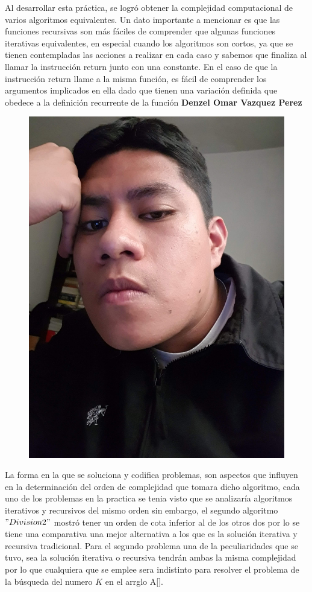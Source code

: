\documentclass[12pt,twoside]{article}
\begin{document}
    Al desarrollar esta práctica, se logró obtener la complejidad computacional de varios algoritmos equivalentes. Un dato importante a mencionar es que las funciones recursivas son más fáciles de comprender que algunas funciones iterativas equivalentes, en especial cuando los algoritmos son cortos, ya que se tienen contempladas las acciones a realizar en cada caso y sabemos que finaliza al llamar la instrucción return junto con una constante. En el caso de que la instrucción return llame a la misma función, es fácil de comprender los argumentos implicados en ella dado que tienen una variación definida que obedece a la definición recurrente de la función
    \newpage
    \textbf{\large Denzel Omar Vazquez Perez}
        \begin{figure}[H]
            \centering
            \includegraphics[angle=-90, scale= 0.05]{imagenes/foto2.jpg}
        \end{figure}
    La forma en la que se soluciona y codifica problemas, son aspectos que influyen en la determinaci\'on del orden de complejidad que tomara dicho algoritmo, cada uno de los problemas en la practica se tenia visto que se analizar\'ia algoritmos iterativos y recursivos del mismo orden sin embargo, el segundo algoritmo $"Division2"$ mostr\'o tener un orden de cota inferior al de los otros dos por lo se tiene una comparativa una mejor alternativa a los que es la soluci\'on iterativa y recursiva tradicional. Para el segundo problema una de la peculiaridades que se tuvo, sea la soluci\'on iterativa o recursiva tendr\'an ambas la misma complejidad por lo que cualquiera que se emplee sera indistinto para resolver el problema de la b\'usqueda del numero $K$ en el arrglo A[]. 
\end{document}

